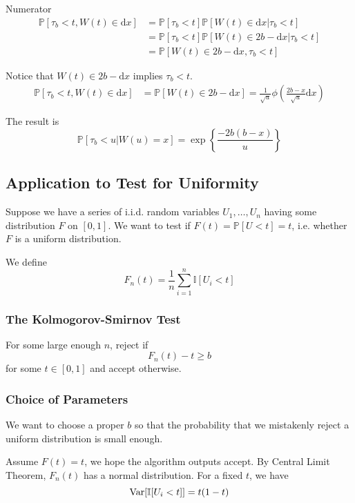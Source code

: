         Numerator
        \begin{align*}
            \mathbb{P}[\tau_b < t, W(t) \in \mathrm{d}x] &= \mathbb{P}[\tau_b < t] \mathbb{P}[W(t) \in \mathrm{d}x | \tau_b < t]\\
            &= \mathbb{P}[\tau_b < t]\mathbb{P}[W(t) \in 2b - \mathrm{d}x | \tau_b < t]\\
            &= \mathbb{P}[W(t) \in 2b-\mathrm{d}x, \tau_b < t]
        \end{align*}

        Notice that $W(t) \in 2b-\mathrm{d}x$ implies $\tau_b < t$.
        \begin{align*}
            \mathbb{P}[\tau_b < t, W(t) \in \mathrm{d}x] &= \mathbb{P}[W(t) \in 2b-\mathrm{d}x] = \frac{1}{\sqrt{u}}\phi\left( \frac{2b-x}{\sqrt{u}}\mathrm{d}x \right)
        \end{align*}

        The result is
        \[ \mathbb{P}[\tau_b < u | W(u) = x] = \exp\left\{ \frac{-2b(b-x)}{u} \right\} \]

    \subsection{Application to Test for Uniformity}
        Suppose we have a series of i.i.d. random variables $U_1, \dots, U_n$ having some distribution $F$ on $[0,1]$. We want to test if $F(t)=\mathbb{P}[U < t]=t$, i.e. whether $F$ is a uniform distribution.

        We define
        \[ F_n(t) = \frac{1}{n} \sum_{i=1}^n \mathbb{I}[U_i < t] \]

        \subsubsection{The Kolmogorov-Smirnov Test}
        For some large enough $n$, reject if
        \[ F_n(t) - t \ge b \]
        for some $t \in [0,1]$ and accept otherwise.

        \subsubsection{Choice of Parameters}
        We want to choose a proper $b$ so that the probability that we mistakenly reject a uniform distribution is small enough.

        Assume $F(t)=t$, we hope the algorithm outputs accept. By Central Limit Theorem, $F_n(t)$ has a normal distribution. For a fixed $t$, we have
        \[ \mathrm{Var}[\mathbb{I}[U_i < t]] = t(1-t) \]

